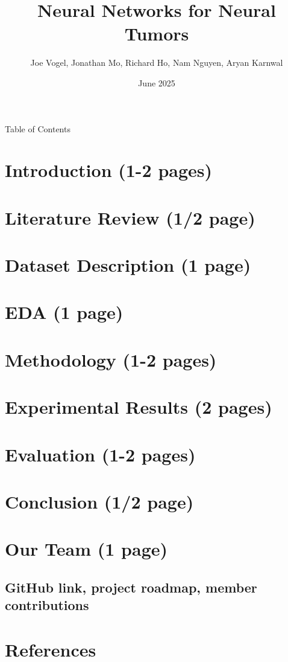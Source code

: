 \documentclass{article}
\title{Neural Networks for Neural Tumors}
\author{Joe Vogel, Jonathan Mo, Richard Ho, Nam Nguyen, Aryan Karnwal}
\date{June 2025}
\begin{document}
\maketitle

{Table of Contents}
\vspace{3 pt}
\section{Introduction (1-2 pages)}
\section{Literature Review (1/2 page)}
\section{Dataset Description (1 page)}
\section{EDA (1 page)}
\section{Methodology (1-2 pages)}
\section{Experimental Results (2 pages)}
\section{Evaluation (1-2 pages)}
\section{Conclusion (1/2 page)}
\section{Our Team (1 page)}
\subsection{GitHub link, project roadmap, member contributions}
\section{References}
\end{document}
